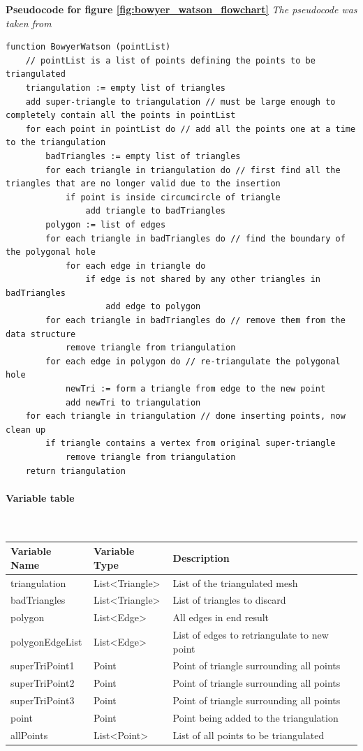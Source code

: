 \documentclass{article}
\newcommand{\myparagraph}[1]{\paragraph{#1}\mbox{}\\} %
\newcommand{\smallBr}{\vspace{1.5mm}}
\begin{document}
\textbf{Pseudocode for figure \ref{fig:bowyer_watson_flowchart}} \linebreak
\textit{The pseudocode was taken from} \cite{BW_alg}
\begin{lstlisting}
function BowyerWatson (pointList)
    // pointList is a list of points defining the points to be triangulated
    triangulation := empty list of triangles
    add super-triangle to triangulation // must be large enough to completely contain all the points in pointList
    for each point in pointList do // add all the points one at a time to the triangulation
        badTriangles := empty list of triangles
        for each triangle in triangulation do // first find all the triangles that are no longer valid due to the insertion
            if point is inside circumcircle of triangle
                add triangle to badTriangles
        polygon := list of edges
        for each triangle in badTriangles do // find the boundary of the polygonal hole
            for each edge in triangle do
                if edge is not shared by any other triangles in badTriangles
                    add edge to polygon
        for each triangle in badTriangles do // remove them from the data structure
            remove triangle from triangulation
        for each edge in polygon do // re-triangulate the polygonal hole
            newTri := form a triangle from edge to the new point
            add newTri to triangulation
    for each triangle in triangulation // done inserting points, now clean up
        if triangle contains a vertex from original super-triangle
            remove triangle from triangulation
    return triangulation
\end{lstlisting}

\myparagraph{Variable table}
\smallBr
\begin{tabular}{l|l|l}
Variable Name   & Variable Type                         & Description                                 \\ \hline
triangulation   & List\textless{}Triangle\textgreater{} & List of the triangulated mesh               \\
badTriangles    & List\textless{}Triangle\textgreater{} & List of triangles to discard                \\
polygon         & List\textless{}Edge\textgreater{}     & All edges in end result                     \\
polygonEdgeList & List\textless{}Edge\textgreater{}     & List of edges to retriangulate to new point \\
superTriPoint1  & Point                                 & Point of triangle surrounding all points    \\
superTriPoint2  & Point                                 & Point of triangle surrounding all points    \\
superTriPoint3  & Point                                 & Point of triangle surrounding all points    \\
point           & Point                                 & Point being added to the triangulation      \\
allPoints       & List\textless{}Point\textgreater{}    & List of all points to be triangulated      
\end{tabular}
\end{document}

